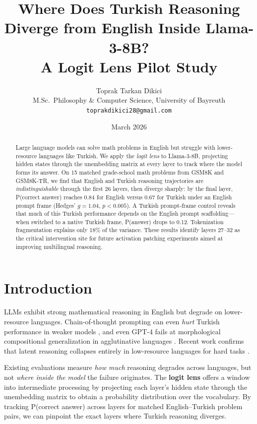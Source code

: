 \documentclass[11pt,a4paper]{article}
\title{Where Does Turkish Reasoning Diverge from English Inside Llama-3-8B?\\[0.3em]
\large A Logit Lens Pilot Study}
\author{Toprak Tarkan Dikici\\
M.Sc.\ Philosophy \& Computer Science, University of Bayreuth\\
\texttt{toprakdikici28@gmail.com}}
\date{March 2026}
\begin{document}
\maketitle

\begin{abstract}
Large language models can solve math problems in English but struggle with lower-resource languages like Turkish.
We apply the \emph{logit lens} to Llama-3-8B, projecting hidden states through the unembedding matrix at every layer to track where the model forms its answer.
On 15 matched grade-school math problems from GSM8K and GSM8K-TR, we find that English and Turkish reasoning trajectories are \emph{indistinguishable} through the first 26 layers, then diverge sharply: by the final layer, P(correct answer) reaches 0.84 for English versus 0.67 for Turkish under an English prompt frame (Hedges' $g = 1.04$, $p < 0.005$).
A Turkish prompt-frame control reveals that much of this Turkish performance depends on the English prompt scaffolding---when switched to a native Turkish frame, P(answer) drops to 0.12.
Tokenization fragmentation explains only 18\% of the variance.
These results identify layers 27--32 as the critical intervention site for future activation patching experiments aimed at improving multilingual reasoning.
\end{abstract}

\section{Introduction}

LLMs exhibit strong mathematical reasoning in English but degrade on lower-resource languages.
Chain-of-thought prompting can even \emph{hurt} Turkish performance in weaker models \citep{yuksel2024turkishmlu}, and even GPT-4 fails at morphological compositional generalization in agglutinative languages \citep{ismayilzada2025}.
Recent work confirms that latent reasoning collapses entirely in low-resource languages for hard tasks \citep{liu2026multilingual}.

Existing evaluations measure \emph{how much} reasoning degrades across languages, but not \emph{where inside the model} the failure originates.
The \textbf{logit lens} \citep{nostalgebraist2020} offers a window into intermediate processing by projecting each layer's hidden state through the unembedding matrix to obtain a probability distribution over the vocabulary.
By tracking P(correct answer) across layers for matched English--Turkish problem pairs, we can pinpoint the exact layers where Turkish reasoning diverges.
\end{document}
